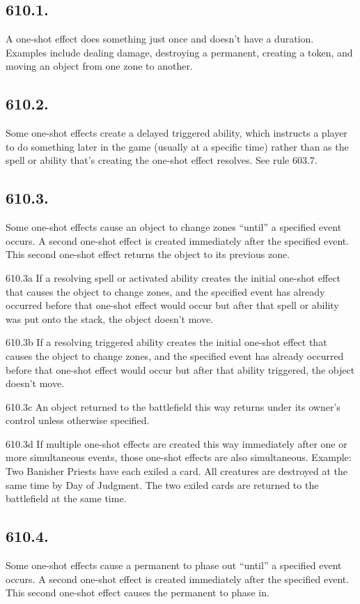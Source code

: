 \subsection*{610.1.}
A one-shot effect does something just once and doesn’t have a duration. Examples include dealing damage, destroying a permanent, creating a token, and moving an object from one zone to another.

\subsection*{610.2.}
Some one-shot effects create a delayed triggered ability, which instructs a player to do something later in the game (usually at a specific time) rather than as the spell or ability that’s creating the one-shot effect resolves. See rule 603.7.

\subsection*{610.3.}
Some one-shot effects cause an object to change zones “until” a specified event occurs. A second one-shot effect is created immediately after the specified event. This second one-shot effect returns the object to its previous zone.

610.3a If a resolving spell or activated ability creates the initial one-shot effect that causes the object to change zones, and the specified event has already occurred before that one-shot effect would occur but after that spell or ability was put onto the stack, the object doesn’t move.

610.3b If a resolving triggered ability creates the initial one-shot effect that causes the object to change zones, and the specified event has already occurred before that one-shot effect would occur but after that ability triggered, the object doesn’t move.

610.3c An object returned to the battlefield this way returns under its owner’s control unless otherwise specified.

610.3d If multiple one-shot effects are created this way immediately after one or more simultaneous events, those one-shot effects are also simultaneous.
Example: Two Banisher Priests have each exiled a card. All creatures are destroyed at the same time by Day of Judgment. The two exiled cards are returned to the battlefield at the same time.

\subsection*{610.4.}
Some one-shot effects cause a permanent to phase out “until” a specified event occurs. A second one-shot effect is created immediately after the specified event. This second one-shot effect causes the permanent to phase in.

